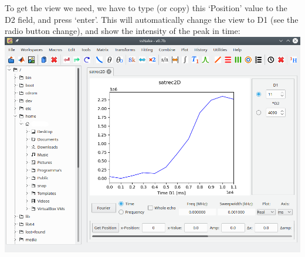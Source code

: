 \documentclass[11pt,a4paper]{article}
\begin{document}
To get the view we need, we have to type (or copy) this `Position' value to the D2 field, and press
`enter'. This will automatically change the view to D1 (see the radio button change), and show the
intensity of the peak in time:\\ \includegraphics[width=\linewidth]{Images/T1.png}
\end{document}

